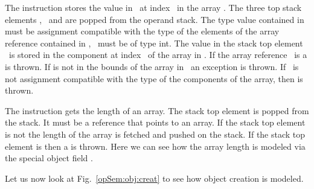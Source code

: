 The instruction \arrstore{} stores the value in \stackOnlyParam{\counterOnly} \ at index  \ in 
 the array  . 
The three top stack elements \stackOnlyParam{\counterOnly},  \  and  
are popped from the operand stack. The type value contained in \stackOnlyParam{\counterOnly} must be assignment 
compatible with the type
of the elements of the array reference contained in ,   \  must be of type int. 
The value in the stack top element \ is stored in the component at index  \  of the array  in  .
If the array reference  \ is \Mynull{} a \NullPointerExc{} is thrown. If     is not in the bounds of the array 
in   \ an \ArrIndexOutOfBoundExc{} exception is thrown. If \stackOnlyParam{\counterOnly} \ is not assignment 
compatible with the type of the components of the array, then \ArrStoreExc{}  is thrown.


The instruction \arraylength{} gets the length of an array.
 The stack top element is popped from the stack. It must be a 
reference that points to an array. If the stack top element is not \Mynull{}  the length of the array  
\length{\stackOnlyParam{\counterOnly} } is fetched and pushed on the stack.
If the stack top element is \Mynull{} then a \NullPointerExc{} is thrown. Here we can see how the array
 length is modeled via the special object field \length. 


Let us now look at Fig.\ \ref{opSem:obj:creat} to  see how 
object creation is modeled.


